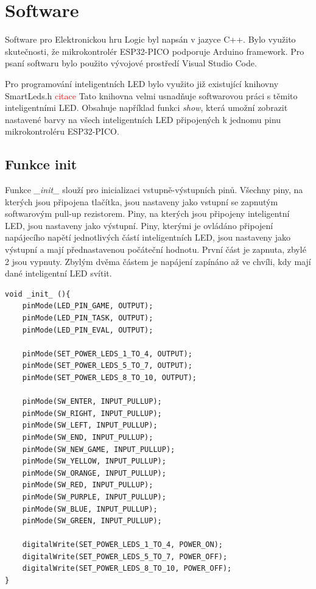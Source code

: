 \chapter{Software}
Software pro Elektronickou hru Logic byl napsán v jazyce C++. Bylo využito skutečnosti, že mikrokontrolér ESP32-PICO podporuje Arduino 
framework. Pro psaní softwaru bylo použito vývojové prostředí Visual Studio Code. 

Pro programování inteligentních LED bylo využito již existující knihovny SmartLeds.h \textcolor{red}{citace}%
Tato knihovna velmi usnadňuje softwarovou práci s těmito inteligentními LED. Obsahuje například funkci {\it show}, která umožní zobrazit 
nastavené barvy na všech inteligentních LED připojených k jednomu pinu mikrokontroléru ESP32-PICO. 

\section{Funkce init}
Funkce {\it \_init\_} slouží pro inicializaci vstupně-výstupních pinů. Všechny piny, na kterých jsou připojena tlačítka, jsou nastaveny jako 
vstupní se zapnutým softwarovým pull-up rezistorem. Piny, na kterých jsou připojeny inteligentní LED, jsou nastaveny jako výstupní. Piny,
kterými je ovládáno připojení napájecího napětí jednotlivých částí inteligentních LED, jsou nastaveny jako výstupní a mají přednastavenou 
počáteční hodnotu. První část je zapnuta, zbylé 2 jsou vypnuty. Zbylým dvěma částem je napájení zapínáno až ve chvíli, kdy mají dané 
inteligentní LED svítit.

\begin{minipage}{\linewidth}
\begin{lstlisting}[frame=single,numbers=right,caption={Funkce pro úvodní inicializaci hardwaru.},label=lst:priklad.vypis.kodu.C,basicstyle=\ttfamily\small, keywordstyle=\color{black}\bfseries\underbar,]
void _init_ (){
    pinMode(LED_PIN_GAME, OUTPUT);
    pinMode(LED_PIN_TASK, OUTPUT);
    pinMode(LED_PIN_EVAL, OUTPUT);

    pinMode(SET_POWER_LEDS_1_TO_4, OUTPUT);
    pinMode(SET_POWER_LEDS_5_TO_7, OUTPUT);
    pinMode(SET_POWER_LEDS_8_TO_10, OUTPUT);

    pinMode(SW_ENTER, INPUT_PULLUP);
    pinMode(SW_RIGHT, INPUT_PULLUP);
    pinMode(SW_LEFT, INPUT_PULLUP);
    pinMode(SW_END, INPUT_PULLUP);
    pinMode(SW_NEW_GAME, INPUT_PULLUP);
    pinMode(SW_YELLOW, INPUT_PULLUP);
    pinMode(SW_ORANGE, INPUT_PULLUP);
    pinMode(SW_RED, INPUT_PULLUP);
    pinMode(SW_PURPLE, INPUT_PULLUP);
    pinMode(SW_BLUE, INPUT_PULLUP);
    pinMode(SW_GREEN, INPUT_PULLUP);

    digitalWrite(SET_POWER_LEDS_1_TO_4, POWER_ON); 
    digitalWrite(SET_POWER_LEDS_5_TO_7, POWER_OFF);
    digitalWrite(SET_POWER_LEDS_8_TO_10, POWER_OFF);
}
    \end{lstlisting}
    \end{minipage}

